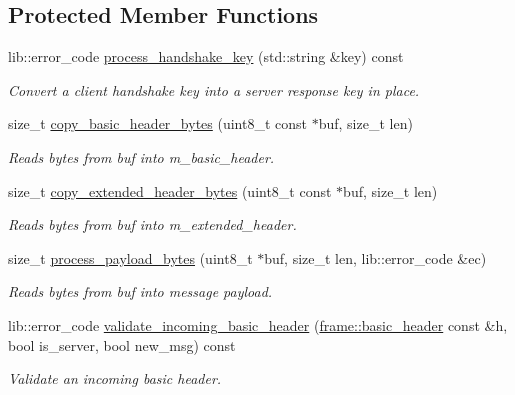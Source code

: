 \subsection*{Protected Member Functions}
\begin{DoxyCompactItemize}
\item 
lib\+::error\+\_\+code \hyperlink{classwebsocketpp_1_1processor_1_1hybi13_ac41721f2e41ab71404e8e67489efb5ed}{process\+\_\+handshake\+\_\+key} (std\+::string \&key) const 
\begin{DoxyCompactList}\small\item\em Convert a client handshake key into a server response key in place. \end{DoxyCompactList}\item 
size\+\_\+t \hyperlink{classwebsocketpp_1_1processor_1_1hybi13_a737c86ee2ec91709052e69f22083afb9}{copy\+\_\+basic\+\_\+header\+\_\+bytes} (uint8\+\_\+t const $\ast$buf, size\+\_\+t len)
\begin{DoxyCompactList}\small\item\em Reads bytes from buf into m\+\_\+basic\+\_\+header. \end{DoxyCompactList}\item 
size\+\_\+t \hyperlink{classwebsocketpp_1_1processor_1_1hybi13_a79fbd0b0670ab1c345ddbb4db76f6a0b}{copy\+\_\+extended\+\_\+header\+\_\+bytes} (uint8\+\_\+t const $\ast$buf, size\+\_\+t len)
\begin{DoxyCompactList}\small\item\em Reads bytes from buf into m\+\_\+extended\+\_\+header. \end{DoxyCompactList}\item 
size\+\_\+t \hyperlink{classwebsocketpp_1_1processor_1_1hybi13_aa7eece3f48840535f41b625061fa7867}{process\+\_\+payload\+\_\+bytes} (uint8\+\_\+t $\ast$buf, size\+\_\+t len, lib\+::error\+\_\+code \&ec)
\begin{DoxyCompactList}\small\item\em Reads bytes from buf into message payload. \end{DoxyCompactList}\item 
lib\+::error\+\_\+code \hyperlink{classwebsocketpp_1_1processor_1_1hybi13_a81806ef9644b11c3f06b7d800ab126ff}{validate\+\_\+incoming\+\_\+basic\+\_\+header} (\hyperlink{structwebsocketpp_1_1frame_1_1basic__header}{frame\+::basic\+\_\+header} const \&h, bool is\+\_\+server, bool new\+\_\+msg) const 
\begin{DoxyCompactList}\small\item\em Validate an incoming basic header. \end{DoxyCompactList}\item 

\end{DoxyCompactItemize}
